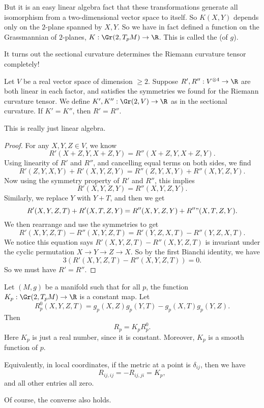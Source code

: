 \documentclass[a4paper]{article}
\begin{document}
But it is an easy linear algebra fact that these transformations generate all isomorphism from a two-dimensional vector space to itself. So $K(X, Y)$ depends only on the $2$-plane spanned by $X, Y$. So we have in fact defined a function on the Grassmannian of $2$-planes, $K: \Gr(2, T_p M) \to \R$. This is called the  (of $g$).

It turns out the sectional curvature determines the Riemann curvature tensor completely!
\begin{lemma}
  Let $V$ be a real vector space of dimension $\geq 2$. Suppose $R', R'': V^{\otimes 4} \to \R$ are both linear in each factor, and satisfies the symmetries we found for the Riemann curvature tensor. We define $K', K'': \Gr(2, V) \to \R$ as in the sectional curvature. If $K' = K''$, then $R' = R''$.
\end{lemma}
This is really just linear algebra.
\begin{proof}
  For any $X, Y, Z \in V$, we know
  \[
    R'(X + Z, Y, X + Z, Y) = R''(X + Z, Y, X + Z, Y).
  \]
  Using linearity of $R'$ and $R''$, and cancelling equal terms on both sides, we find
  \[
    R'(Z, Y, X, Y) + R'(X, Y, Z, Y) = R''(Z, Y, X, Y) + R''(X, Y, Z, Y).
  \]
  Now using the symmetry property of $R'$ and $R''$, this implies
  \[
    R'(X, Y, Z, Y) = R''(X, Y, Z, Y).
  \]
  Similarly, we replace $Y$ with $Y + T$, and then we get
  \[
    R'(X, Y, Z, T) + R'(X, T, Z, Y) = R''(X, Y, Z, Y) + R''"(X, T, Z, Y).
  \]
  We then rearrange and use the symmetries to get
  \[
    R'(X, Y, Z, T) - R''(X, Y, Z, T) = R'(Y, Z, X, T) - R''(Y, Z, X, T).
  \]
  We notice this equation says $R'(X, Y, Z, T) - R''(X, Y, Z, T)$ is invariant under the cyclic permutation $X \to Y \to Z \to X$. So by the first Bianchi identity, we have
  \[
    3(R'(X, Y, Z, T) - R''(X, Y, Z, T)) = 0.
  \]
  So we must have $R' = R''$.
\end{proof}

\begin{cor}
  Let $(M, g)$ be a manifold such that for all $p$, the function $K_p: \Gr(2, T_p M) \to \R$ is a constant map. Let
  \[
    R^0_p (X, Y, Z, T) = g_p(X, Z) g_p(Y, T) - g_p(X, T) g_p(Y, Z).
  \]
  Then
  \[
    R_p= K_p R_p^0.
  \]
  Here $K_p$ is just a real number, since it is constant. Moreover, $K_p$ is a smooth function of $p$.

  Equivalently, in local coordinates, if the metric at a point is $\delta_{ij}$, then we have
  \[
    R_{ij, ij} = - R_{ij, ji} = K_p,
  \]
  and all other entries all zero.
\end{cor}
Of course, the converse also holds.
\end{document}
